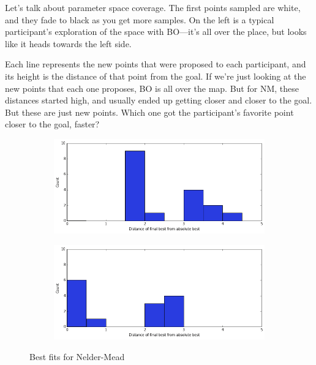 Let's talk about parameter space coverage.
The first points sampled are white, and they fade to black as you get more samples.
On the left is a typical participant's exploration of the space with BO---it's all over the place, but looks like it heads towards the left side.

Each line represents the new points that were proposed to each participant, and its height is the distance of that point from the goal.
If we're just looking at the new points that each one proposes, BO is all over the map.
But for NM, these distances started high, and usually ended up getting closer and closer to the goal.
But these are just new points.
Which one got the participant's favorite point closer to the goal, faster?

\begin{figure}
  \centering
  \begin{subfigure}[b]{0.23\textwidth}
    \includegraphics[width=\textwidth]{figures/bestfits_nm}
  \end{subfigure}
  \begin{subfigure}[b]{0.23\textwidth}
    \includegraphics[width=\textwidth]{figures/bestfits_bo}
  \end{subfigure}
  \caption{Best fits for Nelder-Mead~}\label{fig:bestfits}
\end{figure}

